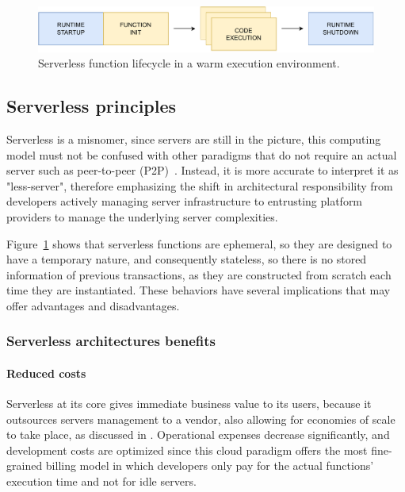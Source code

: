 \begin{figure}[H]
  \centering
  \includegraphics[width=\textwidth]{diagrams/lambda}
  \caption{Serverless function lifecycle in a warm execution environment.}
  \label{fig:serverless-functions-lifecycle}
\end{figure}

\subsection{Serverless principles}

Serverless is a misnomer, since servers are still in the picture,
this computing model must not be confused with other paradigms
that do not require an actual server such as peer-to-peer (P2P)~\cite{serverless-wikipedia}.
Instead, it is more accurate to interpret it as "less-server",
therefore emphasizing the shift in architectural responsibility from developers actively
managing server infrastructure to entrusting platform providers to manage the underlying server complexities.

Figure~\ref{fig:serverless-functions-lifecycle} shows that serverless functions
are ephemeral, so they are designed to have a temporary nature, and consequently
stateless, so there is no stored information of previous transactions, as they are constructed
from scratch each time they are instantiated.
These behaviors have several implications that may offer advantages and disadvantages.

\subsubsection{Serverless architectures benefits}

\paragraph{\textbf{Reduced costs}} Serverless at its core gives immediate
business value to its users, because it outsources servers management
to a vendor, also allowing for economies of scale to take place, as discussed in \cite{berkeley}.
Operational expenses decrease significantly, and development costs are optimized
since this cloud paradigm offers the most fine-grained billing model in which developers
only pay for the actual functions' execution time and not for idle servers.

